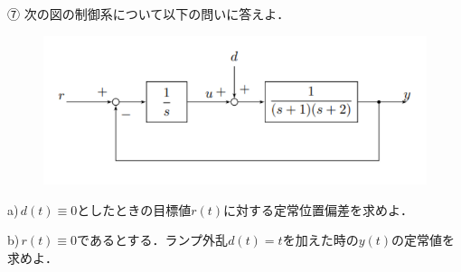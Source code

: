 ⑦ 次の図の制御系について以下の問いに答えよ．
\begin{figure}[H]
    \centering
    \includegraphics[scale=0.75]{figure1.pdf}
\end{figure}

a)\,$d(t)\equiv 0$としたときの目標値$r(t)$に対する定常位置偏差を求めよ．

b)\,$r(t)\equiv 0$であるとする．ランプ外乱$d(t)=t$を加えた時の$y(t)$の定常値を求めよ．



